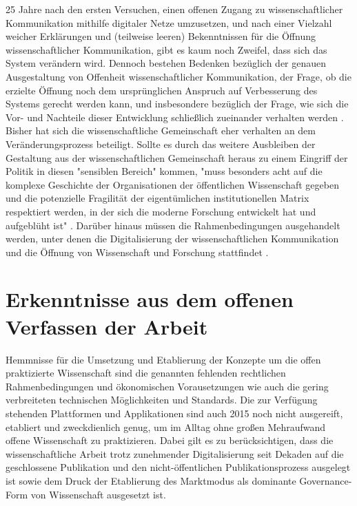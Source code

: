 25 Jahre nach den ersten Versuchen, einen offenen Zugang zu wissenschaftlicher Kommunikation mithilfe digitaler Netze umzusetzen, und nach einer Vielzahl weicher Erklärungen und (teilweise leeren) Bekenntnissen für die Öffnung wissenschaftlicher Kommunikation, gibt es kaum noch Zweifel, dass sich das System verändern wird. Dennoch bestehen Bedenken bezüglich der genauen Ausgestaltung von Offenheit wissenschaftlicher Kommunikation, der Frage, ob die erzielte Öffnung noch dem ursprünglichen Anspruch auf Verbesserung des Systems gerecht werden kann, und insbesondere bezüglich der Frage, wie sich die Vor- und Nachteile dieser Entwicklung schließlich zueinander verhalten werden \cite{hagner_2015_sache_buches}. Bisher hat sich die wissenschaftliche Gemeinschaft eher verhalten an dem Veränderungsprozess beteiligt. Sollte es durch das weitere Ausbleiben der Gestaltung aus der wissenschaftlichen Gemeinschaft heraus zu einem Eingriff der Politik in diesen "sensiblen Bereich" kommen, "muss besonders acht auf die komplexe Geschichte der Organisationen der öffentlichen Wissenschaft gegeben und die potenzielle Fragilität der eigentümlichen institutionellen Matrix respektiert werden, in der sich die moderne Forschung entwickelt hat und aufgeblüht ist" \cite{david1998_common}. Darüber hinaus müssen die Rahmenbedingungen ausgehandelt werden, unter denen die Digitalisierung der wissenschaftlichen Kommunikation und die Öffnung von Wissenschaft und Forschung stattfindet \cite{mennes_2013_making_os}.

\section{Erkenntnisse aus dem offenen Verfassen der Arbeit}

Hemmnisse für die Umsetzung und Etablierung der Konzepte um die offen praktizierte Wissenschaft sind die genannten fehlenden rechtlichen Rahmenbedingungen und ökonomischen Vorausetzungen wie auch die gering verbreiteten technischen Möglichkeiten und Standards. Die zur Verfügung stehenden Plattformen und Applikationen sind auch 2015 noch nicht ausgereift, etabliert und zweckdienlich genug, um im Alltag ohne großen Mehraufwand offene Wissenschaft zu praktizieren. Dabei gilt es zu berücksichtigen, dass die wissenschaftliche Arbeit trotz zunehmender Digitalisierung seit Dekaden auf die geschlossene Publikation und den nicht-öffentlichen Publikationsprozess ausgelegt ist sowie dem Druck der Etablierung des Marktmodus als dominante Governance-Form von Wissenschaft ausgesetzt ist.

